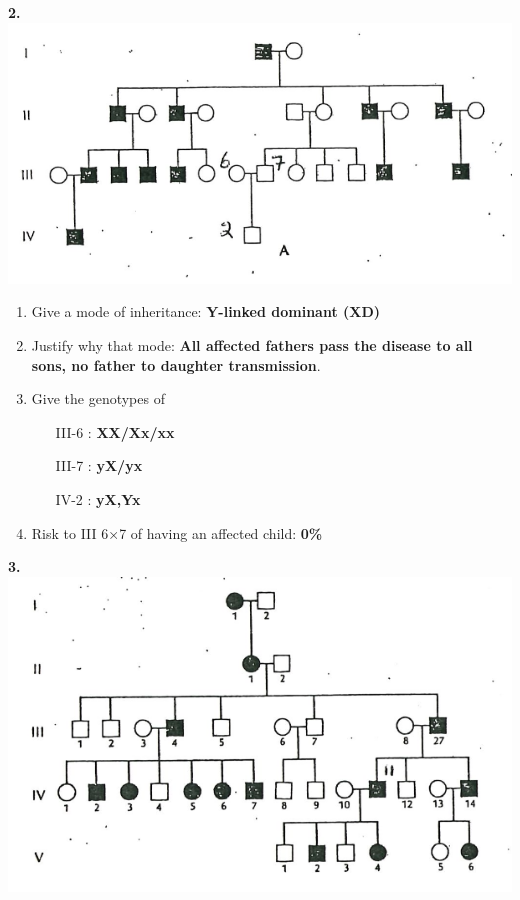 \documentclass[plain,basic]{inVerba-notes}
\begin{document}
    \begin{center}
        \hspace{-25pt}\textbf{2.}\hspace{80pt}\includegraphics[scale=0.5,angle=-0.5,origin=c]{images/pedigree-2.png}
    \end{center}
    \begin{enumerate}[label=\alph*]
        \item Give a mode of inheritance: \textbf{Y-linked dominant (XD)}
        \item Justify why that mode: \textbf{All affected fathers pass the disease to all sons, no father to daughter transmission}.
        \item Give the genotypes of
        \begin{multicols}{3}
            \begin{enumerate}
                \item[III-6]: \textbf{XX/Xx/xx}
                \item[III-7]: \textbf{yX/yx}
                \item[IV-2]: \textbf{yX,Yx}
            \end{enumerate}
        \end{multicols}
        \item Risk to III 6×7 of having an affected child: \textbf{0\%}
    \end{enumerate}
    \begin{center}
        \hspace{-20pt}\textbf{3.}\hspace{100pt}\includegraphics[scale=0.5,angle=-0.5,origin=c]{images/pedigree-3.png}
    \end{center}
\end{document}
